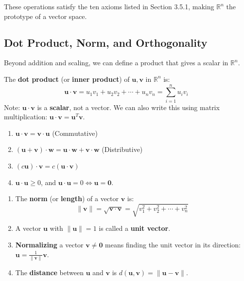 These operations satisfy the ten axioms listed in Section 3.5.1, making $\mathbb{R}^n$ the prototype of a vector space.

\subsection{Dot Product, Norm, and Orthogonality}

Beyond addition and scaling, we can define a product that gives a scalar in $\mathbb{R}^n$.

\begin{definition}
The \textbf{dot product} (or \textbf{inner product}) of $\mathbf{u}, \mathbf{v}$ in $\mathbb{R}^n$ is:
\[ \mathbf{u} \cdot \mathbf{v} = u_1v_1 + u_2v_2 + \cdots + u_nv_n = \sum_{i=1}^n u_i v_i \]
Note: $\mathbf{u} \cdot \mathbf{v}$ is a \textbf{scalar}, not a vector.
We can also write this using matrix multiplication: $\mathbf{u} \cdot \mathbf{v} = \mathbf{u}^T \mathbf{v}$.
\end{definition}

\begin{property}
\begin{enumerate}
    \item $\mathbf{u} \cdot \mathbf{v} = \mathbf{v} \cdot \mathbf{u}$ (Commutative)
    \item $(\mathbf{u} + \mathbf{v}) \cdot \mathbf{w} = \mathbf{u} \cdot \mathbf{w} + \mathbf{v} \cdot \mathbf{w}$ (Distributive)
    \item $(c\mathbf{u}) \cdot \mathbf{v} = c(\mathbf{u} \cdot \mathbf{v})$
    \item $\mathbf{u} \cdot \mathbf{u} \ge 0$, and $\mathbf{u} \cdot \mathbf{u} = 0 \iff \mathbf{u} = \mathbf{0}$.
\end{enumerate}
\end{property}

\begin{definition}
\begin{enumerate}
    \item The \textbf{norm} (or \textbf{length}) of a vector $\mathbf{v}$ is:
    \[ \|\mathbf{v}\| = \sqrt{\mathbf{v} \cdot \mathbf{v}} = \sqrt{v_1^2 + v_2^2 + \cdots + v_n^2} \]
    \item A vector $\mathbf{u}$ with $\|\mathbf{u}\| = 1$ is called a \textbf{unit vector}.
    \item \textbf{Normalizing} a vector $\mathbf{v} \neq \mathbf{0}$ means finding the unit vector in its direction: $\mathbf{u} = \frac{1}{\|\mathbf{v}\|} \mathbf{v}$.
    \item The \textbf{distance} between $\mathbf{u}$ and $\mathbf{v}$ is $d(\mathbf{u}, \mathbf{v}) = \|\mathbf{u} - \mathbf{v}\|$.
\end{enumerate}
\end{definition}

